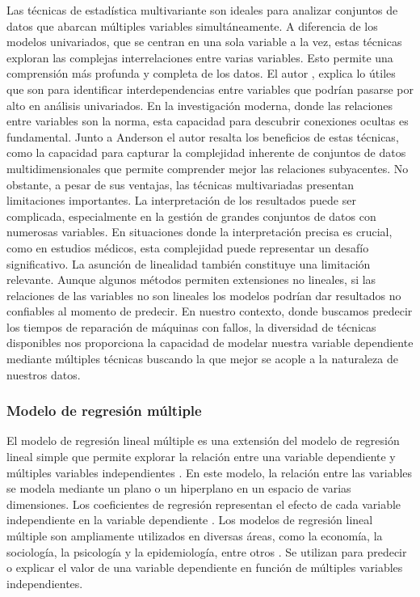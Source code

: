 \documentclass[
  11pt,
  bookmarksnumbered]{article}
\begin{document}
Las técnicas de estadística multivariante son ideales para analizar conjuntos de datos que abarcan múltiples variables simultáneamente.
A diferencia de los modelos univariados, que se centran en una sola variable a la vez, estas técnicas exploran las complejas interrelaciones entre varias variables.
Esto permite una comprensión más profunda y completa de los datos.
El autor \textcite{anderson}, explica lo útiles que son para identificar interdependencias entre variables que podrían pasarse por alto en análisis univariados.
En la investigación moderna, donde las relaciones entre variables son la norma, esta capacidad para descubrir conexiones ocultas es fundamental.
Junto a Anderson el autor \textcite{hair} resalta los beneficios de estas técnicas, como la capacidad para capturar la complejidad inherente de conjuntos de datos multidimensionales que permite comprender mejor las relaciones subyacentes.
No obstante, a pesar de sus ventajas, las técnicas multivariadas presentan limitaciones importantes.
La interpretación de los resultados puede ser complicada, especialmente en la gestión de grandes conjuntos de datos con numerosas variables.
En situaciones donde la interpretación precisa es crucial, como en estudios médicos, esta complejidad puede representar un desafío significativo.
La asunción de linealidad también constituye una limitación relevante.
Aunque algunos métodos permiten extensiones no lineales, si las relaciones de las variables no son lineales los modelos podrían dar resultados no confiables al momento de predecir.
En nuestro contexto, donde buscamos predecir los tiempos de reparación de máquinas con fallos, la diversidad de técnicas disponibles nos proporciona la capacidad de modelar nuestra variable dependiente mediante múltiples técnicas buscando la que mejor se acople a la naturaleza de nuestros datos.

\hypertarget{modelo-de-regresiuxf3n-muxfaltiple}{%
\subsubsection{Modelo de regresión múltiple}\label{modelo-de-regresiuxf3n-muxfaltiple}}

El modelo de regresión lineal múltiple es una extensión del modelo de regresión lineal simple que permite explorar la relación entre una variable dependiente y múltiples variables independientes \textcite{montgomery2012introduction}.
En este modelo, la relación entre las variables se modela mediante un plano o un hiperplano en un espacio de varias dimensiones.
Los coeficientes de regresión representan el efecto de cada variable independiente en la variable dependiente \textcite{fox2015applied}.
Los modelos de regresión lineal múltiple son ampliamente utilizados en diversas áreas, como la economía, la sociología, la psicología y la epidemiología, entre otros \textcite{draper2014applied}.
Se utilizan para predecir o explicar el valor de una variable dependiente en función de múltiples variables independientes.
\end{document}
